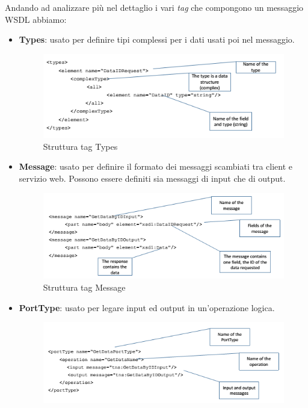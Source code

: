 \documentclass{article}
\begin{document}
Andando ad analizzare più nel dettaglio i vari \textit{tag} che compongono un messaggio WSDL abbiamo:
\begin{itemize}
    \item \textbf{Types}: usato per definire tipi complessi per i dati usati poi nel messaggio.
        \begin{figure}[H]
        \centering
        \includegraphics[scale=0.8]{img/wsdlTypes.png}
        \caption{Struttura tag Types}
        \end{figure}
    \item \textbf{Message}: usato per definire il formato dei messaggi scambiati tra client e servizio web. Possono essere definiti sia messaggi di input che di output.
        \begin{figure}[H]
        \centering
        \includegraphics[scale=0.8]{img/wsdlMessageField.png}
        \caption{Struttura tag Message}
        \end{figure}
    \item \textbf{PortType}: usato per legare input ed output in un'operazione logica.
        \begin{figure}[H]
        \centering
        \includegraphics[scale=0.8]{img/wsdlPortTypes.png}

\end{figure}
\end{itemize}
\end{document}
